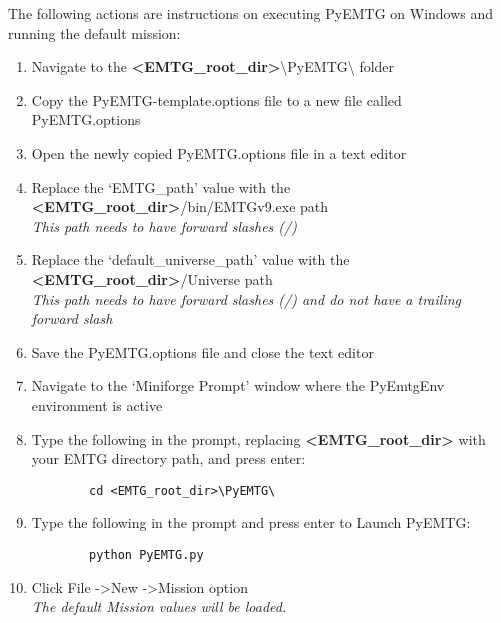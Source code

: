 
\noindent The following actions are instructions on executing PyEMTG on Windows and running the default mission:

\begin{enumerate}
	\item Navigate to the \textbf{\textless EMTG\_root\_dir\textgreater}\textbackslash PyEMTG\textbackslash \hspace{1pt} folder
	\item Copy the PyEMTG-template.options file to a new file called PyEMTG.options
	\item Open the newly copied PyEMTG.options file in a text editor
	\item Replace the ‘EMTG\_path’ value with the \textbf{\textless EMTG\_root\_dir\textgreater}/bin/EMTGv9.exe path \\ \emph{This path needs to have forward slashes (/)}
	\item Replace the ‘default\_universe\_path’ value with the \textbf{\textless EMTG\_root\_dir\textgreater}/Universe path\\ \emph{This path needs to have forward slashes (/) and do not have a trailing forward slash}
	\item Save the PyEMTG.options file and close the text editor
	\item Navigate to the ‘Miniforge Prompt’ window where the PyEmtgEnv environment is active
	\item Type the following in the prompt, replacing \textbf{\textless EMTG\_root\_dir\textgreater} with your EMTG directory path, and press enter:
	\begin{verbatim}
		cd <EMTG_root_dir>\PyEMTG\
	\end{verbatim}
	\item Type the following in the prompt and press enter to Launch PyEMTG:
	\begin{verbatim}
		python PyEMTG.py
	\end{verbatim}
	\item Click File -\textgreater \hspace{1pt}New -\textgreater \hspace{1pt}Mission option\\ \emph{The default Mission values will be loaded.}

\end{enumerate}
